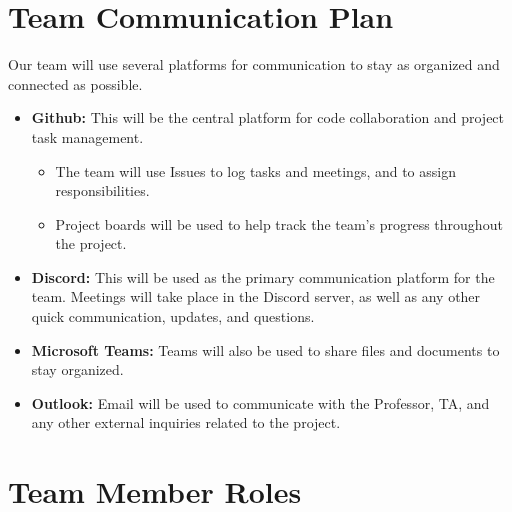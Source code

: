 \documentclass{article}
\begin{document}





\section{Team Communication Plan}

Our team will use several platforms for communication to stay as organized and connected as possible.
\begin{itemize}
	\item {\bf Github:} This will be the central platform for code collaboration and project task management. 
	\begin{itemize}
    \item The team will use Issues to log tasks and meetings, and to assign responsibilities.
    \item Project boards will be used to help track the team's progress throughout the project.
  \end{itemize}
  \item {\bf Discord:} This will be used as the primary communication platform for the team. 
        Meetings will take place in the Discord server, as well as any other quick communication, updates, and questions.
  \item {\bf Microsoft Teams:} Teams will also be used to share files and documents to stay organized.
  \item {\bf Outlook:} Email will be used to communicate with the Professor, TA, and any other external inquiries related to the project.
\end{itemize}

\section{Team Member Roles}
\end{document}
